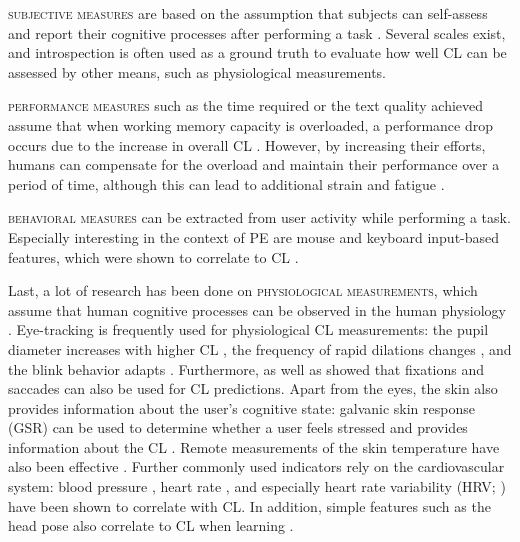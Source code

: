 \documentclass[output=paper]{langsci/langscibook}
\begin{document}
\textsc{subjective measures} are based on the assumption that subjects can self-as\-sess and report their cognitive processes after performing a task \citep{paas1994instructional}. Several scales exist, and introspection is often used as a ground truth to evaluate how well CL can be assessed by other means, such as physiological measurements.

\textsc{performance measures} such as the time required or the text quality achieved assume that when working memory capacity is overloaded, a performance drop occurs due to the increase in overall CL \citep{chen2016robust}. However, by increasing their efforts, humans can compensate for the overload and maintain their performance over a period of time, although this can lead to additional strain and fatigue \citep{hockey1997compensatory}.

\textsc{behavioral measures} can be extracted from user activity while performing a task. Especially interesting in the context of PE are mouse and keyboard input-based features, which were shown to correlate to CL \citep{arshad2013analysing}.

Last, a lot of research has been done on \textsc{physiological measurements}, which assume that human cognitive processes can be observed in the human physiology \citep{kramer1991physiological}.
Eye-tracking is frequently used for physiological CL measurements: the pupil diameter increases with higher CL \citep{iqbal2004task,obrien_eye-tracking_2006}, the frequency of rapid dilations changes \citep{demberg2016frequency}, and the blink behavior adapts \citep{van2001eye}. Furthermore, \citet{chen2013automatic} as well as \citet{stuyven2000effect} showed that fixations and saccades can also be used for CL predictions.
Apart from the eyes, the skin also provides information about the user's cognitive state: galvanic skin response (GSR) can be used to determine whether a user feels stressed \citep{villarejo2012stress} and provides information about the CL \citep{shi2007galvanic}. Remote measurements of the skin temperature have also been effective \citep{yamakoshi2008feasibility}.
Further commonly used indicators rely on the cardiovascular system: blood pressure \citep{yamakoshi2008feasibility}, heart rate \citep{mulder1992measurement}, and especially heart rate variability (HRV; \citealp{rowe1998heart}) have been shown to correlate with CL.
In addition, simple features such as the head pose also correlate to CL when learning \citep{asteriadis2009estimation}.
\end{document}
